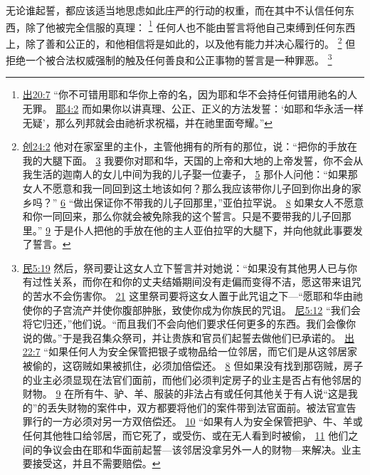 \documentclass[12pt, a4paper, oneside]{ctexart}
\newcounter{parnum}[section]
\newcommand{\N}{%
   \noindent\refstepcounter{parnum}%
    \makebox[\parindent][l]{\textbf{\arabic{parnum}.}}}
\begin{document}
\N 无论谁起誓，都应该适当地思虑如此庄严的行动的权重，而在其中不认信任何东西，除了他被完全信服的真理：
	\footnote {
		\href{https://biblehub.com/exodus/20-7.htm}{出20:7} “你不可错用耶和华你上帝的名，因为耶和华不会持任何错用祂名的人无罪。
		\href{https://biblehub.com/jeremiah/4-2.htm}{耶4:2} 而如果你以讲真理、公正、正义的方法发誓：‘如耶和华永活一样无疑’，那么列邦就会由祂祈求祝福，并在祂里面夸耀。”
	}
	任何人也不能由誓言将他自己束缚到任何东西上，除了善和公正的，和他相信将是如此的，以及他有能力并决心履行的。
	\footnote {
		\href{https://biblehub.com/genesis/24-2.htm}{创24:2} 他对在家室里的主仆，主管他拥有的所有的那位，说：“把你的手放在我的大腿下面。
		\href{https://biblehub.com/genesis/24-3.htm}{3} 我要你对耶和华，天国的上帝和大地的上帝发誓，你不会从我生活的迦南人的女儿中间为我的儿子娶一位妻子，
		\href{https://biblehub.com/genesis/24-5.htm}{5} 那仆人问他：“如果那女人不愿意和我一同回到这土地该如何？那么我应该带你儿子回到你出身的家乡吗？”
		\href{https://biblehub.com/genesis/24-6.htm}{6} “做出保证你不带我的儿子回那里，”亚伯拉罕说。
		\href{https://biblehub.com/genesis/24-8.htm}{8} 如果女人不愿意和你一同回来，那么你就会被免除我的这个誓言。只是不要带我的儿子回那里。”
		\href{https://biblehub.com/genesis/24-9.htm}{9} 于是仆人把他的手放在他的主人亚伯拉罕的大腿下，并向他就此事要发了誓言。
	}
	但拒绝一个被合法权威强制的触及任何善良和公正事物的誓言是一种罪恶。
	\footnote {
		\href{https://biblehub.com/numbers/5-19.htm}{民5:19} 然后，祭司要让这女人立下誓言并对她说：“如果没有其他男人已与你有过性关系，而你在和你的丈夫结婚期间没有走偏而变得不洁，愿这带来诅咒的苦水不会伤害你。
		\href{https://biblehub.com/numbers/5-21.htm}{21} 这里祭司要将这女人置于此咒诅之下---“愿耶和华由祂使你的子宫流产并使你腹部肿胀，致使你成为你族民的咒诅。
		\href{https://biblehub.com/nehemiah/5-12.htm}{尼5:12} “我们会将它归还，”他们说。“而且我们不会向他们要求任何更多的东西。我们会像你说的做。”于是我召集众祭司，并让贵族和官员们起誓去做他们已承诺的。
		\href{https://biblehub.com/exodus/22-7.htm}{出22:7} “如果任何人为安全保管把银子或物品给一位邻居，而它们是从这邻居家被偷的，这窃贼如果被抓住，必须加倍偿还。
		\href{https://biblehub.com/exodus/22-8.htm}{8} 但如果没有找到那窃贼，房子的业主必须显现在法官们面前，而他们必须判定房子的业主是否占有他邻居的财物。
		\href{https://biblehub.com/exodus/22-9.htm}{9} 在所有牛、驴、羊、服装的非法占有或任何其他关于有人说“这是我的”的丢失财物的案件中，双方都要将他们的案件带到法官面前。被法官宣告罪行的一方必须对另一方双倍偿还。
		\href{https://biblehub.com/exodus/22-10.htm}{10} “如果有人为安全保管把驴、牛、羊或任何其他牲口给邻居，而它死了，或受伤、或在无人看到时被偷，
		\href{https://biblehub.com/exodus/22-11.htm}{11} 他们之间的争议会由在耶和华面前起誓---该邻居没拿另外一人的财物---来解决。业主要接受这，并且不需要赔偿。
	}
\end{document}
